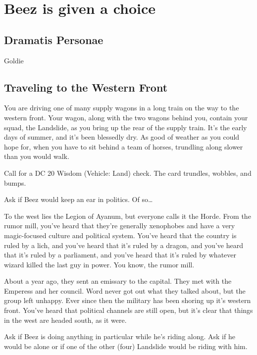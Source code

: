 \section{Beez is given a choice}
\subsection{Dramatis Personae}

Goldie


\begin{multicols}{2}
\subsection{Traveling to the Western Front}
  \begin{aloud}
  You are driving one of many supply wagons in a long train on the way to the western front.
  Your wagon, along with the two wagons behind you, contain your squad, the Landslide, as you
    bring up the rear of the supply train.
  It's the early days of summer, and it's been blessedly dry.
  As good of weather as you could hope for, when you have to sit behind a team of horses,
    trundling along slower than you would walk.
  \end{aloud}

Call for a DC 20 Wisdom (Vehicle: Land) check.
The card trundles, wobbles, and bumps.

Ask if Beez would keep an ear in politics.
Of so\dots

  \begin{aloud}
  To the west lies the Legion of Ayanum, but everyone calls it the Horde.
  From the rumor mill, you've heard that they're generally xenophobes and have a very magic-focused
    culture and political system.
  You've heard that the country is ruled by a lich, and you've heard that it's ruled by a dragon,
    and you've heard that it's ruled by a parliament, and you've heard that it's ruled by whatever
    wizard killed the last guy in power.
  You know, the rumor mill.

  About a year ago, they sent an emissary to the capital.
  They met with the Emperess and her council.
  Word never got out what they talked about, but the group left unhappy.
  Ever since then the military has been shoring up it's western front.
  You've heard that political channels are still open, but it's clear that things in the west are
    headed south, as it were.
  \end{aloud}

Ask if Beez is doing anything in particular while he's riding along.
Ask if he would be alone or if one of the other (four) Landslide would be riding with him.


\end{multicols}
